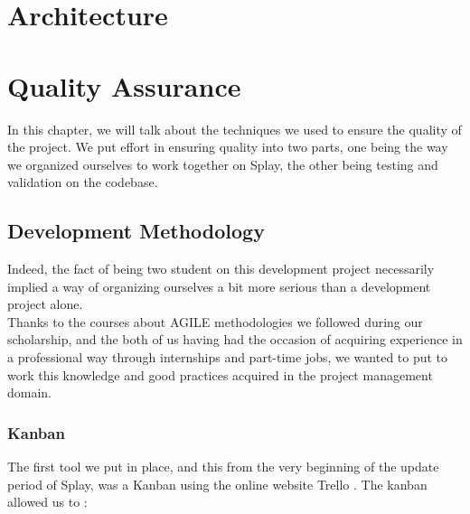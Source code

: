 \documentclass{eplmastersthesis}
\begin{document}
  \chapter{Architecture}

  \chapter{Quality Assurance}

    In this chapter, we will talk about the techniques we used to ensure the
    quality of the project. We put effort in ensuring quality into two
    parts, one being the way we organized ourselves to work together on Splay,
    the other being testing and validation on the codebase.

    \section{Development Methodology}

      Indeed, the fact of being two student on this development project necessarily
      implied a way of organizing ourselves a bit more serious than a
      development project alone.\\

      Thanks to the courses about AGILE methodologies we followed during our
      scholarship, and the both of us having had the occasion of acquiring
      experience in a professional way through internships and part-time jobs,
      we wanted to put to work this knowledge and good practices acquired in
      the project management domain.

        \subsection{Kanban}

          The first tool we put in place, and this from the very beginning of
          the update period of Splay, was a Kanban using the online website
          Trello \cite{trello}. The kanban allowed us to : \\
\end{document}
